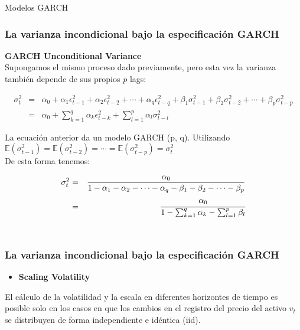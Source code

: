 \documentclass[xcolor=(list of options)]{beamer}
\begin{document}
\begin{section}{Modelos GARCH}
\begin{frame}
\end{frame}

\begin{frame}
\frametitle{La varianza incondicional bajo la especificación GARCH}

\textbf{GARCH Unconditional Variance}\\

Supongamos el mismo proceso dado previamente, pero esta vez la varianza
tambi\'en depende de sus propios $p$ lags:

\begin{eqnarray}
\sigma_{t}^{2} & = & \alpha_{0}+\alpha_{1}\epsilon_{t-1}^{2}+\alpha_{2}\epsilon_{t-2}^{2}+\cdots+\alpha_{q}\epsilon_{t-q}^{2}+\beta_{1}\sigma_{t-1}^{2}+\beta_{2}\sigma_{t-2}^{2}+\cdots+\beta_{p}\sigma_{t-p}^{2}\nonumber \\
 & = & \alpha_{0}+\sum_{k=1}^{q}\alpha_{k}\epsilon_{t-k}^{2}+\sum_{l=1}^{p}\alpha_{l}\sigma_{t-l}^{2}
\end{eqnarray}


La ecuación anterior da un modelo GARCH (p, q). Utilizando\\

$\mathbb{E}\left(\sigma_{t-1}^{2}\right)=\mathbb{E}\left(\sigma_{t-2}^{2}\right)=\cdots=\mathbb{E}\left(\sigma_{t-p}^{2}\right)=\sigma_{t}^{2}$\\


De esta forma tenemos: 

\begin{eqnarray}
\sigma_{t}^{2} & = & \frac{\alpha_{0}}{1-\alpha_{1}-\alpha_{2}-\cdots-\alpha_{q}-\beta_{1}-\beta_{2}-\cdots-\beta_{p}}\nonumber \\
 & = & \cfrac{\alpha_{0}}{1-\sum_{k=1}^{q}\alpha_{k}-\sum_{l=1}^{p}\beta_{l}}
\end{eqnarray}
\\
\end{frame}

\begin{frame}
\frametitle{La varianza incondicional bajo la especificación GARCH}

\begin{itemize}
\item \textbf{Scaling Volatility}
\end{itemize}
El c\'alculo de la volatilidad y la escala en diferentes horizontes de tiempo es
posible solo en los casos en que los cambios en el registro del precio del activo $v_ {t}$ se distribuyen de forma independiente e idéntica (iid).


\end{frame}
\end{section}
\end{document}
